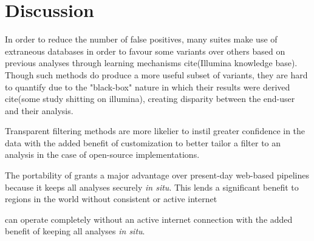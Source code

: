 \section{Discussion}

In order to reduce the number of false positives, many suites make use of extraneous databases in order to favour some variants over others based on previous analyses through learning mechanisms cite(Illumina knowledge base). Though such methods do produce a more useful subset of variants, they are hard to quantify due to the "black-box" nature in which their results were derived cite(some study shitting on illumina), creating disparity between the end-user and their analysis.

Transparent filtering methods are more likelier to instil greater confidence in the data with the added benefit of customization to better tailor a filter to an analysis in the case of open-source implementations.



The portability of \app grants a major advantage over present-day web-based pipelines because it keeps all analyses securely \textit{in situ}. This lends a significant benefit to regions in the world without consistent or active internet

can operate completely without an active internet connection with the added benefit of keeping all analyses \textit{in situ}. 


